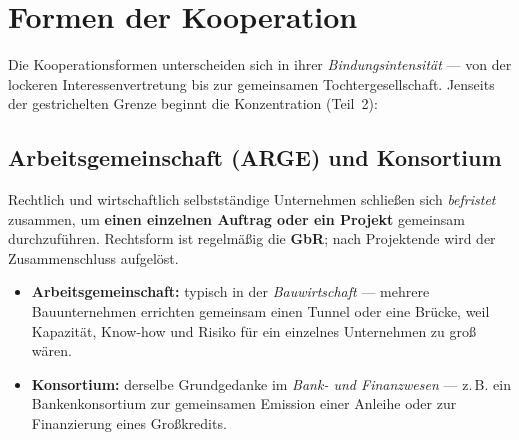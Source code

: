 \documentclass[11pt, a4paper]{article}
\begin{document}
\section{Formen der Kooperation}

Die Kooperationsformen unterscheiden sich in ihrer \emph{Bindungsintensität} --- von der
lockeren Interessenvertretung bis zur gemeinsamen Tochtergesellschaft. Jenseits der
gestrichelten Grenze beginnt die Konzentration (Teil~2):

\begin{center}
\end{center}

\subsection{Arbeitsgemeinschaft (ARGE) und Konsortium}

Rechtlich und wirtschaftlich selbstständige Unternehmen schließen sich \emph{befristet}
zusammen, um \textbf{einen einzelnen Auftrag oder ein Projekt} gemeinsam durchzuführen.
Rechtsform ist regelmäßig die \textbf{GbR}; nach Projektende wird der Zusammenschluss
aufgelöst.

\begin{itemize}
  \item \textbf{Arbeitsgemeinschaft:} typisch in der \emph{Bauwirtschaft} --- mehrere
    Bauunternehmen errichten gemeinsam einen Tunnel oder eine Brücke, weil Kapazität,
    Know-how und Risiko für ein einzelnes Unternehmen zu groß wären.
  \item \textbf{Konsortium:} derselbe Grundgedanke im \emph{Bank- und Finanzwesen} ---
    z.\,B. ein Bankenkonsortium zur gemeinsamen Emission einer Anleihe oder zur
    Finanzierung eines Großkredits.
\end{itemize}
\end{document}

